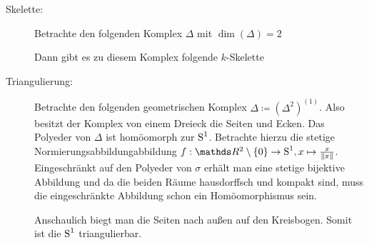 \begin{Bsp}\label{bsp:triangulierung}
  \begin{description}
  \item[Skelette:] Betrachte den folgenden Komplex $\Delta$ mit $\dim(\Delta)=2$\\
    \begin{center}
  \end{center}
  Dann gibt es zu diesem Komplex folgende $k$-Skelette\\
  \begin{center}
    \parbox{0.7\linewidth}{%
  \hfill
  }
\end{center}  

\item[Triangulierung:] Betrachte den folgenden geometrischen Komplex
  $\Delta \coloneqq (\Delta^2)^{(1)}$. Also besitzt der Komplex von
  einem Dreieck die Seiten und Ecken. Das Polyeder von $\Delta$ ist
  homöomorph zur $\operatorname{S}^1$. Betrachte hierzu die stetige
  Normierungsabbildungabbildung
  $f : \R^2 \setminus \sset{0} \rightarrow \Sp^1 , x \mapsto
  \frac{x}{\nn[x]}$.
  Eingeschränkt auf den Polyeder von $\sigma$ erhält man eine stetige
  bijektive Abbildung und da die beiden Räume hausdorffsch und kompakt
  sind, muss die eingeschränkte Abbildung schon ein Homöomorphismus
  sein.
  \begin{center}
\end{center}
Anschaulich biegt man die Seiten nach außen auf den Kreisbogen. Somit
ist die $\operatorname{S}^1$ triangulierbar.
\end{description}
\end{Bsp}

